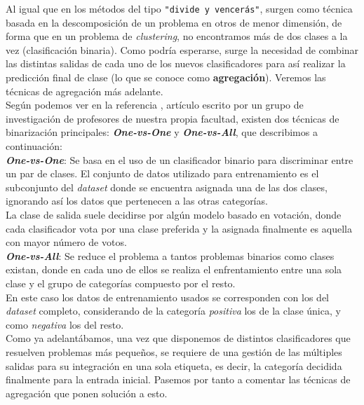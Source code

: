 \documentclass[]{article}
\begin{document}
			Al igual que en los métodos del tipo \verb|"divide y vencerás"|, surgen como técnica basada en la descomposición de un problema en otros de menor dimensión, de forma que en un problema de \textit{clustering}, no encontramos más de dos clases a la vez (clasificación binaria). Como podría esperarse, surge la necesidad de combinar las distintas salidas de cada uno de los nuevos clasificadores para así realizar la predicción final de clase (lo que se conoce como \textbf{agregación}). Veremos las técnicas de agregación más adelante.\\
			
			Según podemos ver en la referencia \cite{binary-classifiers}, artículo escrito por un grupo de investigación de profesores de nuestra propia facultad, existen dos técnicas de binarización principales: \textit{\textbf{One-vs-One}} y \textit{\textbf{One-vs-All}}, que describimos a continuación:\\
			
			{\large \textbf{\textit{One-vs-One}}}: Se basa en el uso de un clasificador binario para discriminar entre un par de clases. El conjunto de datos utilizado para entrenamiento es el subconjunto del \textit{dataset} donde se encuentra asignada una de las dos clases, ignorando así los datos que pertenecen a las otras categorías.\\
			
			La clase de salida suele decidirse por algún modelo basado en votación, donde cada clasificador vota por una clase preferida y la asignada finalmente es aquella con mayor número de votos.\\
			
			{\large \textbf{\textit{One-vs-All}}}: Se reduce el problema a tantos problemas binarios como clases existan, donde en cada uno de ellos se realiza el enfrentamiento entre una sola clase y el grupo de categorías compuesto por el resto.\\
			
			En este caso los datos de entrenamiento usados se corresponden con los del \textit{dataset} completo, considerando de la categoría \textit{positiva} los de la clase única, y como \textit{negativa} los del resto.\\
			
			Como ya adelantábamos, una vez que disponemos de distintos clasificadores que resuelven problemas más pequeños, se requiere de una gestión de las múltiples salidas para su integración en una sola etiqueta, es decir, la categoría decidida finalmente para la entrada inicial. Pasemos por tanto a comentar las técnicas de agregación que ponen solución a esto.
			
\end{document}

